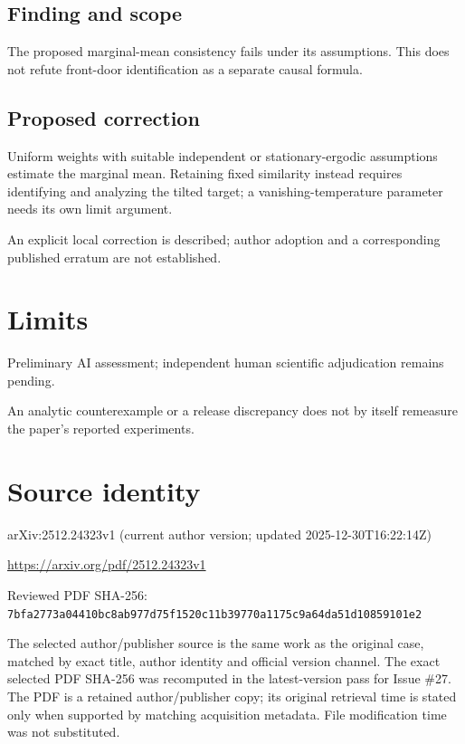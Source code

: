 \documentclass[11pt]{article}
\begin{document}
\subsection*{Finding and scope}

The proposed marginal-mean consistency fails under its assumptions. This does not refute front-door identification as a separate causal formula.

\subsection*{Proposed correction}

Uniform weights with suitable independent or stationary-ergodic assumptions estimate the marginal mean. Retaining fixed similarity instead requires identifying and analyzing the tilted target; a vanishing-temperature parameter needs its own limit argument.

An explicit local correction is described; author adoption and a corresponding published erratum are not established.

\section*{Limits}

Preliminary AI assessment; independent human scientific adjudication remains pending.\par

An analytic counterexample or a release discrepancy does not by itself remeasure the paper’s reported experiments.\par

\section*{Source identity}

arXiv:2512.24323v1 (current author version; updated 2025-12-30T16:22:14Z)

\url{https://arxiv.org/pdf/2512.24323v1}

Reviewed PDF SHA-256: \nolinkurl{7bfa2773a04410bc8ab977d75f1520c11b39770a1175c9a64da51d10859101e2}

The selected author/publisher source is the same work as the original case, matched by exact title, author identity and official version channel. The exact selected PDF SHA-256 was recomputed in the latest-version pass for Issue \#27. The PDF is a retained author/publisher copy; its original retrieval time is stated only when supported by matching acquisition metadata. File modification time was not substituted.
\end{document}
